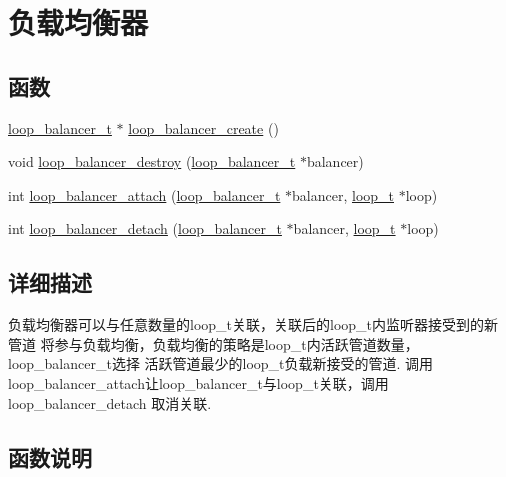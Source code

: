 \hypertarget{group__balancer}{}\section{负载均衡器}
\label{group__balancer}
\subsection*{函数}
\begin{DoxyCompactItemize}
\item 
\hyperlink{struct__loop__balancer__t}{loop\+\_\+balancer\+\_\+t} $\ast$ \hyperlink{group__balancer_ga9992a50e96839282c678e51bc11158d1}{loop\+\_\+balancer\+\_\+create} ()
\item 
void \hyperlink{group__balancer_ga2d702b5f965fe587fdaea3f5f9e2400c}{loop\+\_\+balancer\+\_\+destroy} (\hyperlink{struct__loop__balancer__t}{loop\+\_\+balancer\+\_\+t} $\ast$balancer)
\item 
int \hyperlink{group__balancer_ga2b3cf2cb63d914efe226e901a50d8b0a}{loop\+\_\+balancer\+\_\+attach} (\hyperlink{struct__loop__balancer__t}{loop\+\_\+balancer\+\_\+t} $\ast$balancer, \hyperlink{struct__loop__t}{loop\+\_\+t} $\ast$loop)
\item 
int \hyperlink{group__balancer_ga548ce0c2c624c4f4731a0f963d2ca42a}{loop\+\_\+balancer\+\_\+detach} (\hyperlink{struct__loop__balancer__t}{loop\+\_\+balancer\+\_\+t} $\ast$balancer, \hyperlink{struct__loop__t}{loop\+\_\+t} $\ast$loop)
\end{DoxyCompactItemize}


\subsection{详细描述}

\begin{DoxyPre}
负载均衡器可以与任意数量的loop\_t关联，关联后的loop\_t内监听器接受到的新管道
将参与负载均衡，负载均衡的策略是loop\_t内活跃管道数量，loop\_balancer\_t选择
活跃管道最少的loop\_t负载新接受的管道.
调用loop\_balancer\_attach让loop\_balancer\_t与loop\_t关联，调用loop\_balancer\_detach
取消关联.
\end{DoxyPre}
 

\subsection{函数说明}
\hypertarget{group__balancer_ga2b3cf2cb63d914efe226e901a50d8b0a}{}
